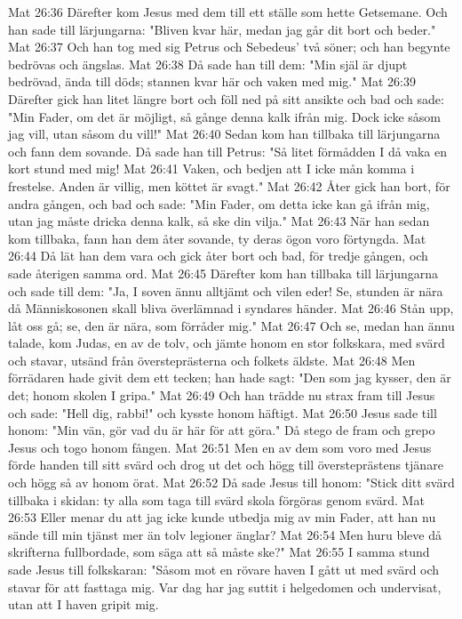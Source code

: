 Mat 26:36  Därefter kom Jesus med dem till ett ställe som hette Getsemane. Och han sade till lärjungarna: "Bliven kvar här, medan jag går dit bort och beder."
Mat 26:37  Och han tog med sig Petrus och Sebedeus' två söner; och han begynte bedrövas och ängslas.
Mat 26:38  Då sade han till dem: "Min själ är djupt bedrövad, ända till döds; stannen kvar här och vaken med mig."
Mat 26:39  Därefter gick han litet längre bort och föll ned på sitt ansikte och bad och sade: "Min Fader, om det är möjligt, så gånge denna kalk ifrån mig. Dock icke såsom jag vill, utan såsom du vill!"
Mat 26:40  Sedan kom han tillbaka till lärjungarna och fann dem sovande. Då sade han till Petrus: "Så litet förmådden I då vaka en kort stund med mig!
Mat 26:41  Vaken, och bedjen att I icke mån komma i frestelse. Anden är villig, men köttet är svagt."
Mat 26:42  Åter gick han bort, för andra gången, och bad och sade: "Min Fader, om detta icke kan gå ifrån mig, utan jag måste dricka denna kalk, så ske din vilja."
Mat 26:43  När han sedan kom tillbaka, fann han dem åter sovande, ty deras ögon voro förtyngda.
Mat 26:44  Då lät han dem vara och gick åter bort och bad, för tredje gången, och sade återigen samma ord.
Mat 26:45  Därefter kom han tillbaka till lärjungarna och sade till dem: "Ja, I soven ännu alltjämt och vilen eder! Se, stunden är nära då Människosonen skall bliva överlämnad i syndares händer.
Mat 26:46  Stån upp, låt oss gå; se, den är nära, som förråder mig."
Mat 26:47  Och se, medan han ännu talade, kom Judas, en av de tolv, och jämte honom en stor folkskara, med svärd och stavar, utsänd från översteprästerna och folkets äldste.
Mat 26:48  Men förrädaren hade givit dem ett tecken; han hade sagt: "Den som jag kysser, den är det; honom skolen I gripa."
Mat 26:49  Och han trädde nu strax fram till Jesus och sade: "Hell dig, rabbi!" och kysste honom häftigt.
Mat 26:50  Jesus sade till honom: "Min vän, gör vad du är här för att göra." Då stego de fram och grepo Jesus och togo honom fången.
Mat 26:51  Men en av dem som voro med Jesus förde handen till sitt svärd och drog ut det och högg till översteprästens tjänare och högg så av honom örat.
Mat 26:52  Då sade Jesus till honom: "Stick ditt svärd tillbaka i skidan: ty alla som taga till svärd skola förgöras genom svärd.
Mat 26:53  Eller menar du att jag icke kunde utbedja mig av min Fader, att han nu sände till min tjänst mer än tolv legioner änglar?
Mat 26:54  Men huru bleve då skrifterna fullbordade, som säga att så måste ske?"
Mat 26:55  I samma stund sade Jesus till folkskaran: "Såsom mot en rövare haven I gått ut med svärd och stavar för att fasttaga mig. Var dag har jag suttit i helgedomen och undervisat, utan att I haven gripit mig.
